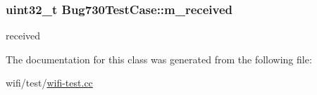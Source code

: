 \subsubsection[{\texorpdfstring{m\+\_\+received}{m_received}}]{\setlength{\rightskip}{0pt plus 5cm}uint32\+\_\+t Bug730\+Test\+Case\+::m\+\_\+received\hspace{0.3cm}{\ttfamily [private]}}\hypertarget{classBug730TestCase_adcd611e94c2c190d0195a229f0331c71}{}\label{classBug730TestCase_adcd611e94c2c190d0195a229f0331c71}


received 



The documentation for this class was generated from the following file\+:\begin{DoxyCompactItemize}
\item 
wifi/test/\hyperlink{wifi-test_8cc}{wifi-\/test.\+cc}\end{DoxyCompactItemize}
